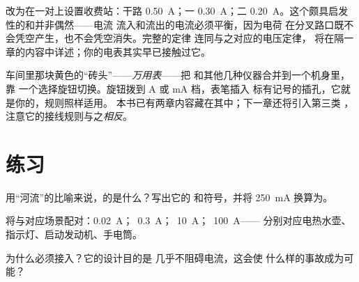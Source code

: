 \begin{example}[一瞥节点]\label{ex:g8:intensity-ammeter:junction}
改为在一对上设置收费站：干路
\qty{0.50}{A}；一 \qty{0.30}{A}；二
\qty{0.20}{A}。这个颇具启发性的和并非偶然——电流
流入和流出的电流必须平衡，因为电荷
在分叉路口既不会凭空产生，也不会凭空消失。完整的定律
连同与之对应的电压定律，
将在隔一章的内容中详述；你的电表其实早已接触过它。
\end{example}

\begin{remark}[万用表]\label{rem:g8:intensity-ammeter:multimeter}
车间里那块黄色的“砖头”——\emph{万用表}——把
和其他几种仪器合并到一个机身里，靠
一个选择旋钮切换。旋钮拨到 \unit{A} 或 \unit{mA} 档，表笔插入
标有记号的插孔，它就是你的，规则照样适用。
本书已有两章内容藏在其中；下一章还将引入第三类
，注意它的接线规则与之\emph{相反}。
\end{remark}

\section{练习}

\begin{exercise}[$\star$]\label{exo:g8:intensity-ammeter:1}
用“河流”的比喻来说，的是什么？写出它的
和符号，并将 \qty{250}{mA} 换算为。
\end{exercise}

\begin{exercise}[$\star$]\label{exo:g8:intensity-ammeter:2}
将与对应场景配对：\qty{0.02}{A}；\
\qty{0.3}{A}；\ \qty{10}{A}；\ \qty{100}{A}——
分别对应电热水壶、指示灯、启动发动机、手电筒。
\end{exercise}

\begin{exercise}[$\star$]\label{exo:g8:intensity-ammeter:3}
为什么必须接入？它的设计目的是
几乎不阻碍电流，这会使
什么样的事故成为可能？
\end{exercise}

